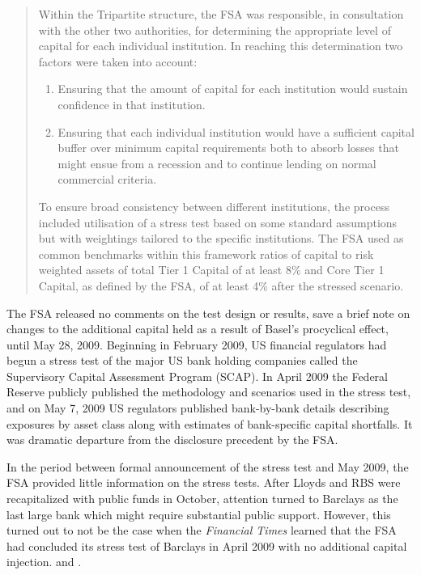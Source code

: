 \documentclass[12pt]{article}
\begin{document}
\begin{quote}
	Within the Tripartite structure, the FSA was responsible, in consultation with the other two authorities, for determining the appropriate level of capital for each individual institution.  In reaching this determination two factors were taken into account:
	
	\begin{enumerate}
		\item Ensuring that the amount of capital for each institution would sustain confidence in that institution. 
		\item Ensuring that each individual institution would have a sufficient capital buffer over minimum capital requirements both to absorb losses that might ensue from a recession and to continue lending on normal commercial criteria.   
	\end{enumerate}
	
	To ensure broad consistency between different institutions, the process included utilisation of a stress test based on some standard assumptions but with weightings tailored to the specific institutions.  The FSA used as common benchmarks within this framework ratios of capital to risk weighted assets of total Tier 1 Capital of at least 8\% and  Core Tier 1 Capital, as defined by the FSA, of at least  4\% after the stressed scenario.
	
\end{quote}

The FSA released no comments on the test design or results, save a brief note on changes to the additional capital held as a result of Basel's procyclical effect, until May 28, 2009. Beginning in February 2009, US financial regulators had begun a stress test of the major US bank holding companies called the Supervisory Capital Assessment Program (SCAP). In April 2009 the Federal Reserve publicly published the methodology and scenarios used in the stress test, and on May 7, 2009 US regulators published bank-by-bank details describing exposures by asset class along with estimates of bank-specific capital shortfalls. It was dramatic departure from the disclosure precedent by the FSA. 

In the period between formal announcement of the stress test and May 2009, the FSA provided  little information on the stress tests. After Lloyds and RBS were recapitalized with public funds in October, attention turned to Barclays as the last large bank which might require substantial public support. However, this turned out to not be the case when the \textit{Financial Times} learned that the FSA had concluded its stress test of Barclays in April 2009 with no additional capital injection. \citep{Barclays1} and \citep{Lex}.
\end{document}
